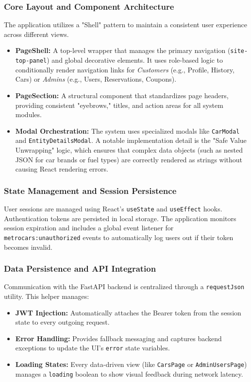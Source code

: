 \subsubsection{Core Layout and Component Architecture}
The application utilizes a "Shell" pattern to maintain a consistent user experience across different views. 
\begin{itemize}
    \item \textbf{PageShell:} A top-level wrapper that manages the primary navigation (\texttt{site-top-panel}) and global decorative elements. It uses role-based logic to conditionally render navigation links for \textit{Customers} (e.g., Profile, History, Cars) or \textit{Admins} (e.g., Users, Reservations, Coupons).
    \item \textbf{PageSection:} A structural component that standardizes page headers, providing consistent "eyebrows," titles, and action areas for all system modules.
    \item \textbf{Modal Orchestration:} The system uses specialized modals like \texttt{CarModal} and \texttt{EntityDetailsModal}. A notable implementation detail is the "Safe Value Unwrapping" logic, which ensures that complex data objects (such as nested JSON for car brands or fuel types) are correctly rendered as strings without causing React rendering errors.
\end{itemize}



\subsubsection{State Management and Session Persistence}
User sessions are managed using React's \texttt{useState} and \texttt{useEffect} hooks. 
Authentication tokens are persisted in local storage. 
The application monitors session expiration and includes a global event listener for \texttt{metrocars:unauthorized} 
events to automatically log users out if their token becomes invalid.

\subsubsection{Data Persistence and API Integration}
Communication with the FastAPI backend is centralized through a \texttt{requestJson} utility. This helper manages:
\begin{itemize}
    \item \textbf{JWT Injection:} Automatically attaches the Bearer token from the session state to every outgoing request.
    \item \textbf{Error Handling:} Provides fallback messaging and captures backend exceptions to update the UI's \texttt{error} state variables.
    \item \textbf{Loading States:} Every data-driven view (like \texttt{CarsPage} or \texttt{AdminUsersPage}) manages a \texttt{loading} boolean to show visual feedback during network latency.
\end{itemize}

